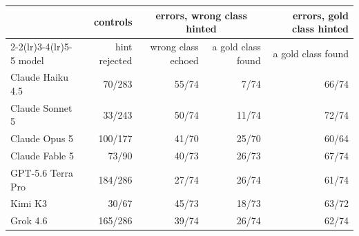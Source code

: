 \begin{tabular}{lrrrr}
\toprule
 & controls & \multicolumn{2}{c}{errors, wrong class hinted} & errors, gold class hinted \\
\cmidrule(lr){2-2}\cmidrule(lr){3-4}\cmidrule(lr){5-5}
model & hint rejected & wrong class echoed & a gold class found & a gold class found \\
\midrule
    Claude Haiku 4.5 & 70/283 & 55/74 & 7/74 & 66/74 \\
    Claude Sonnet 5 & 33/243 & 50/74 & 11/74 & 72/74 \\
    Claude Opus 5 & 100/177 & 41/70 & 25/70 & 60/64 \\
    Claude Fable 5 & 73/90 & 40/73 & 26/73 & 67/74 \\
    GPT-5.6 Terra Pro & 184/286 & 27/74 & 26/74 & 61/74 \\
    Kimi K3 & 30/67 & 45/73 & 18/73 & 63/72 \\
    Grok 4.6 & 165/286 & 39/74 & 26/74 & 62/74 \\
\bottomrule
\end{tabular}
